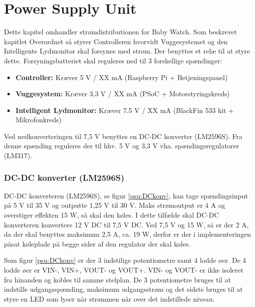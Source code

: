 \chapter{Power Supply Unit}

Dette kapitel omhandler strømdistributionen for Baby Watch. Som beskrevet kapitlet Overordnet så styrer Controlleren hvorvidt Vuggesystemet og den Intelligente Lydmonitor skal forsynes med strøm. Der benyttes et relæ til at styre dette. Forsyningsbatteriet skal reguleres ned til 3 forskellige spændinger:

\begin{itemize}
\item \textbf{Controller:} Kræver 5 V / XX mA (Raspberry Pi + Betjeningspanel)

\item \textbf{Vuggesystem:} Kræver 3,3 V / XX mA (PSoC + Motorstyringskreds)

\item \textbf{Intelligent Lydmonitor:} Kræver 7.5 V / XX mA (BlackFin 533 kit + Mikrofonkreds)
\end{itemize}

Ved nedkonverteringen til 7,5 V benyttes en DC-DC konverter (LM2596S). Fra denne spænding reguleres der til hhv. 5 V og 3,3 V vha. spændingsregulatorer (LM317). 


\subsection{DC-DC konverter (LM2596S)}

DC-DC konverteren (LM2596S), se figur \ref{psu:DCkonv}, kan tage spændingsinput på 5 V til 35 V og outputte 1,25 V til 30 V. Maks strømoutput er 4 A og overstiger effekten 15 W, så skal den køles. I dette tilfælde skal DC-DC konverteren konvertere 12 V DC til 7,5 V DC. Ved 7,5 V og 15 W, så er der 2 A, da der skal benyttes maksimum 2,5 A, ca. 19 W, derfor er der i implementeringen påsat køleplade på begge sider af den regulator der skal køles. 


Som figur \ref{psu:DCkonv} er der 3 indstilige potentiometre samt 4 lodde øer. De 4 lodde øer er VIN-, VIN+, VOUT- og VOUT+. VIN- og VOUT- er ikke isoleret fra hinanden og kobles til samme stelplan. De 3 potentiometre bruges til at indstille udgangsspænding, maksimum udgangsstrøm og det sidste bruges til at styre en LED som lyser når strømmen når over det indstillede niveau. 

